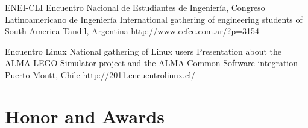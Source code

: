 \documentclass[11pt,a4paper,sans]{moderncv}
\begin{document}
        {ENEI-CLI}
        {Encuentro Nacional de Estudiantes de Ingeniería, Congreso Latinoamericano de Ingeniería}
        {International gathering of engineering students of South America}
        {Tandil, Argentina \url{http://www.cefce.com.ar/?p=3154}}
        {}

        {Encuentro Linux}
        {National gathering of Linux users}
        {Presentation about the ALMA LEGO Simulator project and the ALMA Common Software integration}
        {Puerto Montt, Chile}
        {\url{http://2011.encuentrolinux.cl/}}

\section{Honor and Awards}

\end{document}

